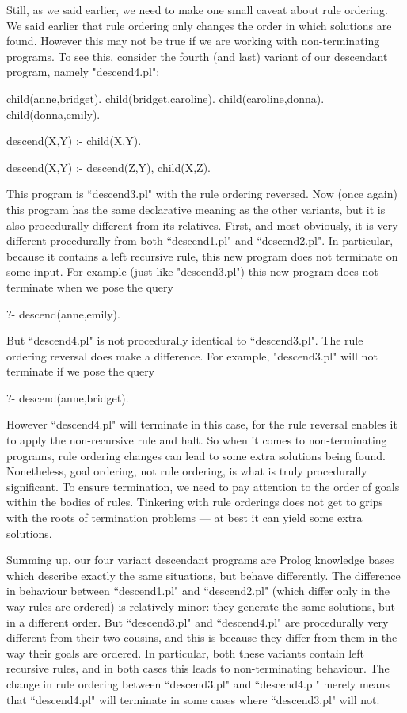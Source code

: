 Still, as we said earlier, we need to make one small caveat about rule
ordering. We said earlier that rule ordering only changes the order in
which solutions are found. However this may not be true
if we are working with non-terminating programs. To see this, consider
the fourth (and last) variant of our descendant program, namely
"descend4.pl":
\begin{LPNcodedisplay}
child(anne,bridget).
child(bridget,caroline).
child(caroline,donna).
child(donna,emily).

descend(X,Y) :- child(X,Y).

descend(X,Y) :- descend(Z,Y),
                 child(X,Z).
\end{LPNcodedisplay}
This program is ``descend3.pl" with the rule ordering
reversed.  Now (once again) this program has the same declarative
meaning as the other variants, but it is also procedurally different from
its relatives. First, and most obviously, it is very different
procedurally from both ``descend1.pl" and ``descend2.pl".  In
particular, because it contains a left recursive rule, this new
program does not terminate on some input.  For example (just like
"descend3.pl") this new program does not terminate when we pose the
query
\begin{LPNcodedisplay}
?- descend(anne,emily).
\end{LPNcodedisplay}
But ``descend4.pl" is not procedurally identical to ``descend3.pl".
The rule ordering reversal does make a difference. For example,
"descend3.pl" will not terminate if we pose the query
\begin{LPNcodedisplay}
?- descend(anne,bridget).
\end{LPNcodedisplay}
However ``descend4.pl" will terminate in this case, for the rule
reversal enables it to apply the non-recursive rule and halt. So when
it comes to non-terminating programs, rule ordering changes can lead
to some extra solutions being found. Nonetheless, goal ordering, not
rule ordering, is what is truly procedurally significant.  To ensure
termination, we need to pay attention to the order of goals within the
bodies of rules.  Tinkering with rule orderings does not  get to
grips with the roots of termination problems --- at best it can yield
some extra solutions.

Summing up, our four variant descendant programs are Prolog knowledge
bases which describe exactly the same situations, but behave
differently.  The difference in behaviour between ``descend1.pl" and
``descend2.pl" (which differ only in the way rules are ordered) is
relatively minor: they generate the same solutions, but in a different
order.  But ``descend3.pl" and ``descend4.pl" are procedurally very
different from their two cousins, and this is because they differ from
them in the way their goals are ordered.  In particular, both these
variants contain left recursive rules, and in both cases this leads to
non-terminating behaviour.  The change in rule ordering
between ``descend3.pl" and ``descend4.pl" merely means that
``descend4.pl" will terminate in some cases where ``descend3.pl" will
not.



